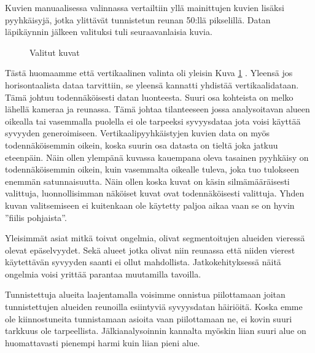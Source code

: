 Kuvien manuaalisessa valinnassa vertailtiin yllä mainittujen kuvien lisäksi pyyhkäisyjä,
jotka ylittävät tunnistetun reunan 50:llä pikselillä.
Datan läpikäynnin jälkeen valituksi tuli seuraavanlaisia kuvia.

\begin{figure}[h]
\centering
{}
\caption{Valitut kuvat}
\label{fig:selected}
\end{figure}

Tästä huomaamme että vertikaalinen valinta oli yleisin Kuva \ref{fig:selected} .
Yleensä jos horisontaalista dataa tarvittiin, se yleensä kannatti yhdistää vertikaalidataan.
Tämä johtuu todennäköisesti datan luonteesta. Suuri osa kohteista on melko lähellä kameraa ja reunassa.
Tämä johtaa tilanteeseen jossa analysoitavan alueen oikealla tai vasemmalla puolella ei ole tarpeeksi syvyysdataa jota voisi käyttää syvyyden generoimiseen.
Vertikaalipyyhkäistyjen kuvien data on myös todennäköisemmin oikein, koska suurin osa datasta on tieltä joka jatkuu eteenpäin.
Näin ollen ylempänä kuvassa kauempana oleva tasainen pyyhkäisy on todennäköisemmin oikein, kuin vasemmalta oikealle tuleva, joka tuo tulokseen enemmän satunnaisuutta.
Näin ollen koska kuvat on käsin silmämääräisesti valittuja, luonnollisimman näköiset kuvat ovat todennäköisesti valittuja.
Yhden kuvan valitsemiseen ei kuitenkaan ole käytetty paljoa aikaa vaan se on hyvin ”fiilis pohjaista”.

Yleisimmät asiat mitkä toivat ongelmia, olivat segmentoitujen alueiden vieressä olevat epäselvyydet.
Sekä alueet jotka olivat niin reunassa että niiden vierest käytettävän syvyyden saanti ei ollut mahdollista.
Jatkokehityksessä näitä ongelmia voisi yrittää parantaa muutamilla tavoilla. 

Tunnistettuja alueita laajentamalla voisimme onnistua piilottamaan joitan tunnistettujen alueiden reunoilla esiintyviä syvyysdatan häiriöitä.
Koska emme ole kiinnostuneita tunnistamaan asioita vaan piilottamaan ne, ei kovin suuri tarkkuus ole tarpeellista.
Jälkianalysoinnin kannalta myöskin liian suuri alue on huomattavasti pienempi harmi kuin liian pieni alue.


